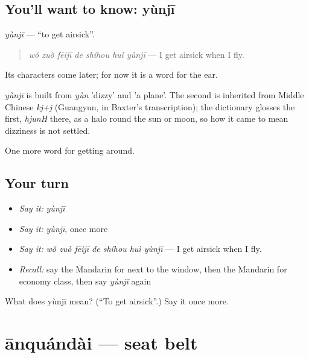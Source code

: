 \subsection*{You'll want to know: yùnjī}
\emph{yùnjī} — \textquotedblleft{}to get airsick\textquotedblright{}.

\begin{quote}
\emph{wǒ zuò fēijī de shíhou huì yùnjī} — I get airsick when I fly.
\end{quote}

Its characters come later; for now it is a word for the ear.

\begin{cousinweb}
\emph{yùnjī} is built from \emph{yùn} 'dizzy' and  'a plane'. The second is inherited from Middle Chinese \emph{kj+j} (Guangyun, in Baxter's transcription); the dictionary glosses the first, \emph{hjunH} there, as a halo round the sun or moon, so how it came to mean dizziness is not settled.
\end{cousinweb}

\begin{grammarlens}[title={What you've built}]
One more word for getting around.
\end{grammarlens}

\subsection*{Your turn}
\begin{itemize}
\raggedright
  \item \emph{Say it:} \emph{yùnjī}
  \item \emph{Say it:} \emph{yùnjī}, once more
  \item \emph{Say it:} \emph{wǒ zuò fēijī de shíhou huì yùnjī} — I get airsick when I fly.
  \item \emph{Recall:} say the Mandarin for next to the window, then the Mandarin for economy class, then say \emph{yùnjī} again
\end{itemize}

\begin{tcolorbox}[breakable,colback=teal!4,colframe=teal!35!black,title={Before you move on}]
What does yùnjī mean? (\textquotedblleft{}To get airsick\textquotedblright{}.) Say it once more.
\end{tcolorbox}
\section[ānquándài]{ānquándài — seat belt}

